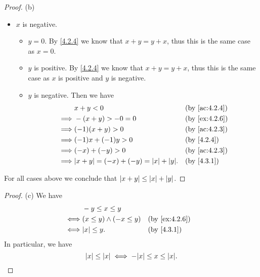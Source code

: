 \begin{proof}{(b)}
\begin{itemize}
\begin{itemize}
\begin{itemize}
			            \end{itemize}
		      \end{itemize}
		\item \(x\) is negative.
		      \begin{itemize}
			      \item \(y = 0\).
			            By \cref{4.2.4} we know that \(x + y = y + x\), thus this is the same case as \(x = 0\).
			      \item \(y\) is positive.
			            By \cref{4.2.4} we know that \(x + y = y + x\), thus this is the same case as \(x\) is positive and \(y\) is negative.
			      \item \(y\) is negative.
			            Then we have
			            \begin{align*}
				                     & x + y < 0                                      &  & \by{ac:4.2.4} \\
				            \implies & -(x + y) > -0 = 0                              &  & \by{ex:4.2.6} \\
				            \implies & (-1)(x + y) > 0                                &  & \by{ac:4.2.3} \\
				            \implies & (-1)x + (-1)y > 0                              &  & \by{4.2.4}    \\
				            \implies & (-x) + (-y) > 0                                &  & \by{ac:4.2.3} \\
				            \implies & \abs{x + y} = (-x) + (-y) = \abs{x} + \abs{y}. &  & \by{4.3.1}
			            \end{align*}
		      \end{itemize}
	\end{itemize}
	For all cases above we conclude that \(\left\lvert x + y\right\rvert \leq \left\lvert x\right\rvert + \left\lvert y\right\rvert\).
\end{proof}

\begin{proof}{(c)}
	We have
	\begin{align*}
		     & -y \leq x \leq y                                \\
		\iff & (x \leq y) \land (-x \leq y) &  & \by{ex:4.2.6} \\
		\iff & \abs{x} \leq y.              &  & \by{4.3.1}
	\end{align*}
	In particular, we have
	\[
		\abs{x} \leq \abs{x} \iff -\abs{x} \leq x \leq \abs{x}.
	\]
\end{proof}

